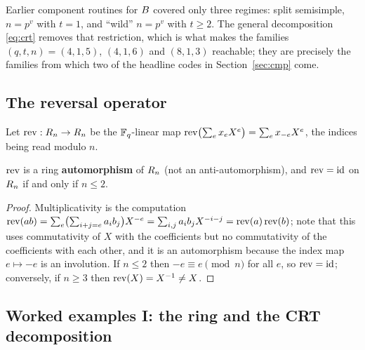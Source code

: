 \begin{remark}[the CRT step is what opens $n=5,6$]
Earlier component routines for $B$ covered only three regimes: split
semisimple, $n=p^v$ with $t=1$, and ``wild'' $n=p^v$ with $t\ge2$. The general
decomposition \eqref{eq:crt} removes that restriction, which is what makes the
families $(q,t,n)=(4,1,5)$, $(4,1,6)$ and $(8,1,3)$ reachable; they are
precisely the families from which two of the headline codes in
Section~\ref{sec:cmp} come.
\end{remark}

\subsection{The reversal operator}

\begin{definition}\label{def:rev}
Let $\operatorname{rev}:R_n\to R_n$ be the $\mathbb F_q$-linear map
$\operatorname{rev}\bigl(\sum_ex_eX^e\bigr)=\sum_ex_{-e}X^e$, the indices being read modulo
$n$.
\end{definition}

\begin{lemma}\label{lem:rev}
$\operatorname{rev}$ is a ring \textbf{automorphism} of $R_n$ (not an anti-automorphism), and
$\operatorname{rev}=\mathrm{id}$ on $R_n$ if and only if $n\le2$.
\end{lemma}

\begin{proof}
Multiplicativity is the computation
$\operatorname{rev}(ab)=\sum_e\bigl(\sum_{i+j=e}a_ib_j\bigr)X^{-e}
=\sum_{i,j}a_ib_jX^{-i-j}=\operatorname{rev}(a)\operatorname{rev}(b)$; note that this uses commutativity
of $X$ with the coefficients but no commutativity of the coefficients with each
other, and it is an automorphism because the index map $e\mapsto -e$ is an
involution. If $n\le2$ then $-e\equiv e\pmod n$ for all $e$, so $\operatorname{rev}=\mathrm{id}$;
conversely, if $n\ge3$ then $\operatorname{rev}(X)=X^{-1}\ne X$.
\end{proof}

\subsection{Worked examples I: the ring and the CRT decomposition}

